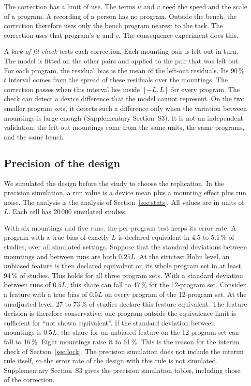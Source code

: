 The correction has a limit of use.
The terms $u$ and $v$ need the speed and the scale of a program.
A recording of a person has no program.
Outside the bench, the correction therefore uses only the bench program nearest to the task.
The correction uses that program's $u$ and $v$.
The consequence experiment does this.

A \emph{lack-of-fit check} tests each correction.
Each mounting pair is left out in turn.
The model is fitted on the other pairs and applied to the pair that was left out.
For each program, the residual bias is the mean of the left-out residuals.
Its 90\,\% $t$ interval comes from the spread of these residuals over the mountings.
The correction passes when this interval lies inside $[-L,L]$ for every program.
The check can detect a device difference that the model cannot represent.
On the two smaller program sets, it detects such a difference only when the variation between mountings is large enough (Supplementary Section~S3).
It is not an independent validation: the left-out mountings come from the same units, the same programs, and the same bench.

\subsection{Precision of the design}
\label{sec:precision}
We simulated the design before the study to choose the replication.
In the precision simulation, a run value is a device mean plus a mounting effect plus run noise.
The analysis is the analysis of Section~\ref{sec:stats}.
All values are in units of $L$.
Each cell has 20\,000 simulated studies.

With six mountings and five runs, the per-program test keeps its error rate.
A program with a true bias of exactly $L$ is declared equivalent in 4.5 to 5.1\,\% of studies, over all simulated settings.
Suppose that the standard deviations between mountings and between runs are both $0.25L$.
At the strictest Holm level, an unbiased feature is then declared equivalent on its whole program set in at least 94\,\% of studies.
This holds for all three program sets.
With a standard deviation between runs of $0.5L$, this share can fall to 47\,\% for the 12-program set.
Consider a feature with a true bias of $0.5L$ on every program of the 12-program set.
At the unadjusted level, 27 to 73\,\% of studies declare this feature equivalent.
The feature decision is therefore conservative: one program outside the equivalence limit is sufficient for ``not shown equivalent''.
If the standard deviation between mountings is $0.5L$, the share for an unbiased feature on the 12-program set can fall to 16\,\%.
Eight mountings raise it to 61\,\%.
This is the reason for the interim check of Section~\ref{sec:lock}.
The precision simulation does not include the interim rule itself, so the error rate of the design with this rule is not simulated.
Supplementary Section~S3 gives the precision simulation tables, including those of the correction.

